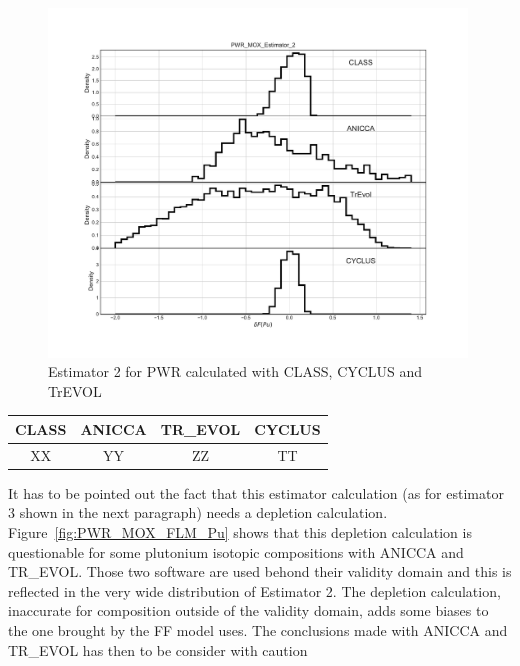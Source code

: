 \begin{figure}[h]
	\begin{center}
		\includegraphics[width = 0.99\textwidth]{../../Feature_1/RAW_DATA/FIG/PWR_MOX_Estimator_2.pdf}
		\caption{Estimator 2 for \gls{PWR} calculated with CLASS, CYCLUS and TrEVOL}
		\label{fig:Est2_PWR}
	\end{center}
\end{figure}

\begin{table}[h]
	\begin{center}
		\begin{tabular}{|c||c||c||c|}
			\hline 
				CLASS & ANICCA & TR\_EVOL & CYCLUS \\
			\hline
				XX & YY & ZZ & TT \\
		\end{tabular}
	\end{center}
	\label{table:Est2_PWR}
\end{table}

It has to be pointed out the fact that this estimator calculation (as for
estimator 3 shown in the next paragraph) needs a depletion calculation.
Figure~\ref{fig:PWR_MOX_FLM_Pu} shows that this depletion calculation is
questionable for some plutonium isotopic compositions with ANICCA and TR\_EVOL.
Those two software are used behond their validity domain and this is reflected
in the very wide distribution of Estimator 2. The depletion calculation,
inaccurate for composition outside of the validity domain, adds some biases to
the one brought by the \gls{FF} model uses. The conclusions made with ANICCA and
TR\_EVOL has then to be consider with caution

